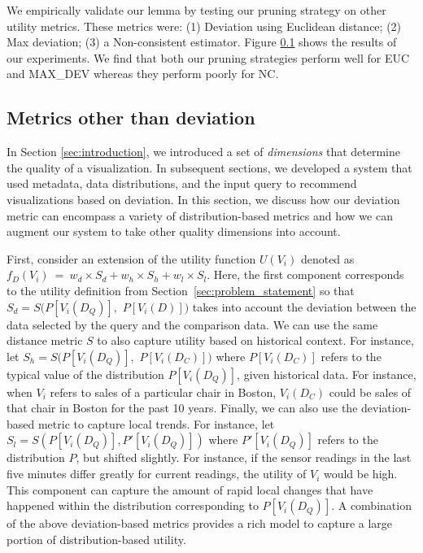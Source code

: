 {We empirically validate our lemma by testing our pruning strategy on other utility metrics. 
These metrics were: (1) Deviation using Euclidean distance; (2) Max deviation; (3) a Non-consistent
estimator.
Figure \ref{} shows the results of our experiments. 
We find that both our pruning strategies perform well for EUC and MAX\_DEV whereas they perform
poorly for NC.

\subsection{Metrics other than deviation}


In Section \ref{sec:introduction}, we introduced a set of {\it dimensions} that determine the quality of a visualization.
In subsequent sections, we developed a system that used metadata, data distributions, and the input query
to recommend visualizations based on deviation.
In this section, we discuss how our deviation metric can encompass a variety of distribution-based metrics and how we can augment our system to take other quality dimensions into account.

First, consider an extension of the utility function $U (V_i)$ denoted as $f_D (V_i)\ =\ w_d \times S_d + w_h \times S_h + w_l  \times S_l$.
Here, the first component corresponds to the utility definition from Section~\ref{sec:problem_statement}
so that $S_d = S ( P[V_i (D_Q)],$ $P[V_i (D)] )$ takes into account the deviation between the data selected by the query and the comparison data.
We can use the same distance metric $S$ to also capture utility based on historical context. 
For instance, let $S_h = S ( P[V_i (D_Q)], $ $P[V_i (D_C)] )$ where
$P[V_i (D_C)]$ refers to the typical value of the distribution 
$P[V_i (D_Q)]$, given historical data.
For instance, when $V_i$ refers to sales of a particular chair in 
Boston, $V_i(D_C)$ could be sales of that chair in Boston for the past 10 years.
Finally, we can also use the deviation-based metric to capture local trends.
For instance, let $S_l = S ( P[V_i (D_Q)], P'[V_i (D_Q)] )$ where
$P'[V_i (D_Q)]$ refers to the distribution $P$, but shifted slightly.
For instance, if the sensor readings in the last five minutes differ greatly
for current readings, the utility of $V_i$ would be high.
This component can capture
the amount of rapid local changes that have happened
within the distribution corresponding to $P[V_i (D_Q)]$.
A combination of the above deviation-based metrics provides a rich model to capture a large
portion of distribution-based utility.

}
